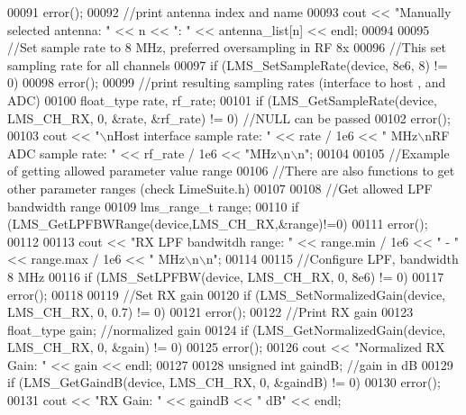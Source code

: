 \begin{DoxyCode}
00091         error();
00092    \textcolor{comment}{//print antenna index and name}
00093     cout << \textcolor{stringliteral}{"Manually selected antenna: "} << n << \textcolor{stringliteral}{": "} << antenna\_list[n] << endl;
00094 
00095     \textcolor{comment}{//Set sample rate to 8 MHz, preferred oversampling in RF 8x}
00096     \textcolor{comment}{//This set sampling rate for all channels}
00097     \textcolor{keywordflow}{if} (LMS_SetSampleRate(device, 8e6, 8) != 0)
00098         error();
00099     \textcolor{comment}{//print resulting sampling rates (interface to host , and ADC)}
00100     float_type rate, rf\_rate;
00101     \textcolor{keywordflow}{if} (LMS_GetSampleRate(device, LMS_CH_RX, 0, &rate, &rf\_rate) != 0)  \textcolor{comment}{//NULL can be passed}
00102         error();
00103     cout << \textcolor{stringliteral}{"\(\backslash\)nHost interface sample rate: "} << rate / 1e6 << \textcolor{stringliteral}{" MHz\(\backslash\)nRF ADC sample rate: "} << rf\_rate / 1e6
       << \textcolor{stringliteral}{"MHz\(\backslash\)n\(\backslash\)n"};
00104 
00105     \textcolor{comment}{//Example of getting allowed parameter value range}
00106     \textcolor{comment}{//There are also functions to get other parameter ranges (check LimeSuite.h)}
00107 
00108     \textcolor{comment}{//Get allowed LPF bandwidth range}
00109     lms_range_t range;
00110     \textcolor{keywordflow}{if} (LMS_GetLPFBWRange(device,LMS_CH_RX,&range)!=0)
00111         error();
00112 
00113     cout << \textcolor{stringliteral}{"RX LPF bandwitdh range: "} << range.min / 1e6 << \textcolor{stringliteral}{" - "} << range.max / 1e6 << \textcolor{stringliteral}{" MHz\(\backslash\)n\(\backslash\)n"};
00114 
00115     \textcolor{comment}{//Configure LPF, bandwidth 8 MHz}
00116     \textcolor{keywordflow}{if} (LMS_SetLPFBW(device, LMS_CH_RX, 0, 8e6) != 0)
00117         error();
00118 
00119     \textcolor{comment}{//Set RX gain}
00120     \textcolor{keywordflow}{if} (LMS_SetNormalizedGain(device, LMS_CH_RX, 0, 0.7) != 0)
00121         error();
00122     \textcolor{comment}{//Print RX gain}
00123     float_type gain; \textcolor{comment}{//normalized gain}
00124     \textcolor{keywordflow}{if} (LMS_GetNormalizedGain(device, LMS_CH_RX, 0, &gain) != 0)
00125         error();
00126     cout << \textcolor{stringliteral}{"Normalized RX Gain: "} << gain << endl;
00127 
00128     \textcolor{keywordtype}{unsigned} \textcolor{keywordtype}{int} gaindB; \textcolor{comment}{//gain in dB}
00129     \textcolor{keywordflow}{if} (LMS_GetGaindB(device, LMS_CH_RX, 0, &gaindB) != 0)
00130         error();
00131     cout << \textcolor{stringliteral}{"RX Gain: "} << gaindB << \textcolor{stringliteral}{" dB"} << endl;

\end{DoxyCode}
